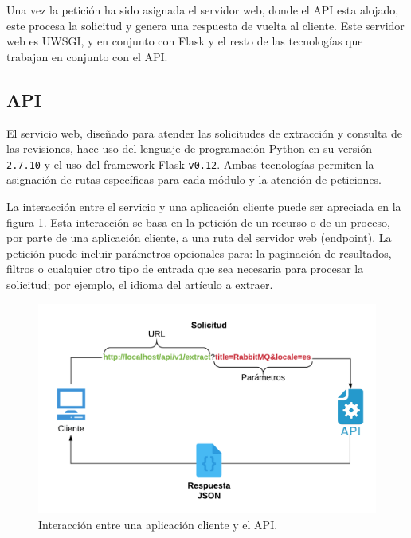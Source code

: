 Una vez la petición ha sido asignada el servidor web, donde el API esta alojado, este procesa la solicitud y genera una respuesta de vuelta al cliente.
Este servidor web es UWSGI, y en conjunto con Flask y el resto de las tecnologías que trabajan en conjunto con el API.





\subsection{API}

El servicio web, diseñado para atender las solicitudes de extracción y consulta de las revisiones, hace uso del lenguaje de programación Python
en su versión \texttt{2.7.10} y el uso del framework Flask \texttt{v0.12}.
Ambas tecnologías permiten la asignación de rutas específicas para cada módulo
y la atención de peticiones.

La interacción entre el servicio y una aplicación cliente puede ser apreciada en la figura \ref{fig:diagram_api_1}.
Esta interacción se basa en la petición de un recurso o de un proceso, por parte de una aplicación cliente, a una ruta del servidor
web (endpoint). La petición puede incluir parámetros opcionales para: la paginación de resultados, filtros o cualquier
otro tipo de entrada que sea necesaria para procesar la solicitud; por ejemplo, el idioma del artículo a extraer.

\begin{figure}[H]
	\centering
		\includegraphics[width=1\textwidth]{figures/diagram_api_1}
	\caption{Interacción entre una aplicación cliente y el API.}
	\label{fig:diagram_api_1}
\end{figure}



